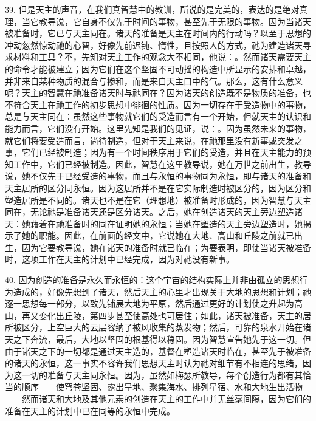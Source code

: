 39. 但是天主的声音，在我们真智慧中的教训，所说的是完美的，表达的是绝对真理，当它教导说，它自身不仅先于时间的事物，甚至先于无限的事物。因为当诸天被准备时，它已与天主同在。诸天的准备是天主在时间内的行动吗？以至于思想的冲动忽然惊动祂的心智，好像先前迟钝、惰性，且按照人的方式，祂为建造诸天寻求材料和工具？不，先知对天主工作的观念大不相同，他说：。然而诸天需要天主的命令才能被建立；因为它们在这个坚固不可动摇的构造中所显示的安排和卓越，并非来自某种物质的混合与掺和，而是来自天主口中的气。那么，这有什么意义呢？天主的智慧在祂准备诸天时与祂同在？因为诸天的创造既不是物质的准备，也不符合天主在祂工作的初步思想中徘徊的性质。因为一切存在于受造物中的事物，总是与天主同在：虽然这些事物就它们的受造而言有一个开始，但就天主的认识和能力而言，它们没有开始。这里先知是我们的见证，说：。因为虽然未来的事物，就它们将要受造而言，尚待制造，但对于天主来说，在祂那里没有新事或突发之事，它们已经被制造；因为有一个时间秩序用于它们的受造，并且在天主能力的预知工作中，它们已经被制造。因此，智慧在这里教导说，她在万世之前出生，教导说，她不仅先于已经受造的事物，而且与永恒的事物同为永恒，即与诸天的准备和天主居所的区分同永恒。因为这居所并不是在它实际制造时被区分的，因为区分和塑造居所是不同的。诸天也不是在它（理想地）被准备时形成的，因为智慧与天主同在，无论祂是准备诸天还是区分诸天。之后，她在创造诸天的天主旁边塑造诸天：她藉着在祂准备时的同在证明她的永恒；当她在塑造的天主旁边塑造时，她揭示了她的职能。因此，在前面的经文中，它说她在大地、高山和丘陵之前就已出生，因为它要教导说，她在诸天的准备时就已临在；为要表明，即使当诸天被准备时，这项工作在天主的计划中已经完成，因为对祂没有新事。\par

40. 因为创造的准备是永久而永恒的：这个宇宙的结构实际上并非由孤立的思想行为造成的，好像先想到了诸天，然后天主的心里才出现关于大地的思想和计划；祂逐一思想每一部分，以致先铺展大地为平原，然后通过更好的计划使之升起为高山，再又变化出丘陵，第四步甚至使高处也可居住；如此，诸天被准备，天主的居所被区分，上空巨大的云层容纳了被风收集的蒸发物；然后，可靠的泉水开始在诸天之下奔流，最后，大地以坚固的根基得以稳固。因为智慧宣告她先于这一切。但由于诸天之下的一切都是通过天主造的，基督在塑造诸天时临在，甚至先于被准备的诸天的永恒，这一事实不容许我们思想天主时认为祂对细节有不相连的思绪，因为这一切的准备与天主同永恒。因为，虽然如梅瑟所教导，每个创造行为都有其恰当的顺序——使穹苍坚固、露出旱地、聚集海水、排列星宿、水和大地生出活物——然而诸天和大地及其他元素的创造在天主的工作中并无丝毫间隔，因为它们的准备在天主的计划中已在同等的永恒中完成。\par

